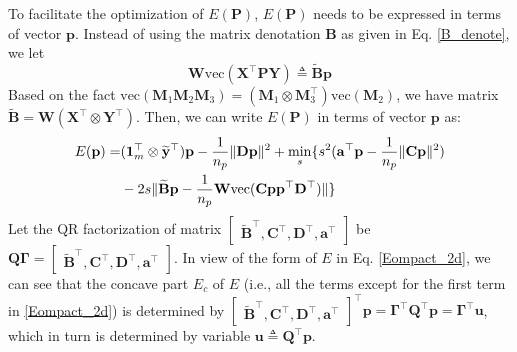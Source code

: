 \documentclass[11pt,bezier,]{article}
\begin{document}
To facilitate the optimization of $E(\mathbf P)$,
$E(\mathbf P)$ needs to be expressed  in terms of vector $\mathbf p$.
Instead of using the  matrix denotation $\mathbf B$ as given in Eq. \eqref{B_denote},
we let
\[
\mathbf W\text{vec}(\mathbf X^\top\mathbf P\mathbf Y)\triangleq \mathbf  {\widetilde B} \mathbf p
\]
Based on the fact 
$\text{vec}(\mathbf M_1\mathbf  M_2\mathbf  M_3)= (\mathbf M_1\otimes\mathbf M_3^\top)\text{vec}(\mathbf M_2)$,
we have matrix
$
\mathbf {\widetilde B}=\mathbf W(\mathbf X^\top\otimes \mathbf Y^\top)
$.
Then, we can write  $E(\mathbf P)$ in terms of vector $\mathbf p$ as:
  \begin{align}
E(\mathbf p)= & 
(\mathbf 1_m^\top\otimes\mathbf { \widetilde y}^\top)\mathbf  p 
- \frac{1}{n_p} \|\mathbf D\mathbf  p \|^2  %
+ \min_{s} \{s^2 (\mathbf a^\top\mathbf  p    - \frac{1}{n_p}    \|\mathbf C\mathbf  p \|^2)  \notag\\
& - 2s \|\mathbf {\widetilde B}\mathbf  p   - \frac{1}{n_p} \mathbf W\text{vec}(\mathbf  C\mathbf p\mathbf  p^\top \mathbf D^\top )\| \} \label{Eompact_2d}
\end{align}                  
Let the QR factorization of matrix $
\begin{bmatrix}
\mathbf {\widetilde B}^\top,\mathbf C^\top,\mathbf D^\top,\mathbf  a^\top
\end{bmatrix}
$ be
$
\mathbf Q\mathbf \Gamma=\begin{bmatrix}
\mathbf {\widetilde B}^\top ,\mathbf C^\top,\mathbf D^\top,\mathbf  a^\top
\end{bmatrix}
$.
In view of the form of $E$ in Eq. \eqref{Eompact_2d},
we can see that
the concave part $E_c$ of $E$
(i.e., all the terms except for the first term in \eqref{Eompact_2d})
is   determined by 
$\begin{bmatrix}
\mathbf{\widetilde B}^\top ,\mathbf C^\top,\mathbf D^\top,\mathbf  a^\top
\end{bmatrix}^\top\mathbf p =\mathbf \Gamma^\top \mathbf Q^\top\mathbf p =\mathbf \Gamma^\top\mathbf u$,
which in turn is determined by variable $\mathbf u\triangleq  \mathbf Q^\top\mathbf p$. 
\end{document}
